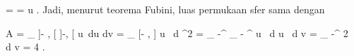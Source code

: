 {\mavergleichskettedisp
{\vergleichskette
{ 
}
{ =} { 
}
{ =} { \cos  u
}
{ } {
}
{ } {
}
}
{}{}{.}
Jadi, menurut
teorema Fubini,
luas permukaan sfer sama dengan

\mavergleichskettealign
{\vergleichskettealign
{A
}
{ =} {
\int_{  ]- {  } , {  } [ \times ]-\pi, \pi[   }   \cos  u  \,du \wedge dv
}
{ =} { \int_{  [- {  }, {  }] \times [-\pi, \pi]   }   \cos  u    \,  d  \lambda^2
}
{ =} { \int_{  -\pi }^{  \pi } \int_{  - {  }  }^{  {  }  } \cos  u \, d  u \, d v
}
{ =} { \int_{  -\pi }^{  \pi } 2 \, d v
}
}
{
\vergleichskettefortsetzungalign
{ =} { 4 \pi
}
{ } {}
{ } {}
{ } {}
}
{}{.}

}
